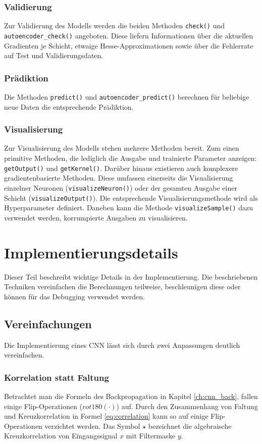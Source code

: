 \subsubsection{Validierung}
Zur Validierung des Modells werden die beiden Methoden \texttt{check()} und \texttt{autoencoder\_check()} angeboten. Diese liefern Informationen über die aktuellen Gradienten je Schicht, etwaige Hesse-Approximationen sowie über die Fehlerrate auf Test und Validierungsdaten.

\subsubsection{Prädiktion}
Die Methoden \texttt{predict()} und \texttt{autoencoder\_predict()} berechnen für beliebige neue Daten die entsprechende Prädiktion.

\subsubsection{Visualisierung} 
Zur Visualisierung des Modells stehen mehrere Methoden bereit. Zum einen primitive Methoden, die lediglich die Ausgabe und trainierte Parameter anzeigen: \texttt{getOutput()} und \texttt{getKernel()}. Darüber hinaus existieren auch komplexere gradientenbasierte Methoden. Diese umfassen einerseits die Visualisierung einzelner Neuronen (\texttt{visualize\-Neuron()}) oder der gesamten Ausgabe einer Schicht (\texttt{visualize\-Output()}). Die entsprechende Visualisierungsmethode wird als Hyperparameter definiert. Daneben kann die Methode \texttt{visualizeSample()} dazu verwendet werden, korrumpierte Ausgaben zu visualisieren.

\section{Implementierungsdetails}
Dieser Teil beschreibt wichtige Details in der Implementierung. Die beschriebenen Techniken vereinfachen die Berechnungen teilweise, beschleunigen diese oder können für das Debugging verwendet werden.

\subsection{Vereinfachungen}
Die Implementierung eines CNN lässt sich durch zwei Anpassungen deutlich vereinfachen.

\subsubsection{Korrelation statt Faltung}
Betrachtet man die Formeln des Backpropagation in Kapitel \ref{ch:cnn_back}, fallen einige Flip-Operationen ($rot180(\cdot)$) auf. Durch den Zusammenhang von Faltung und Kreuzkorrelation in Formel \ref{eq:correlation} kann so auf einige Flip-Operationen verzichtet werden. Das Symbol $\star$ bezeichnet die algebraische Kreuzkorrelation von Eingangssignal $x$ mit Filtermaske $y$.

